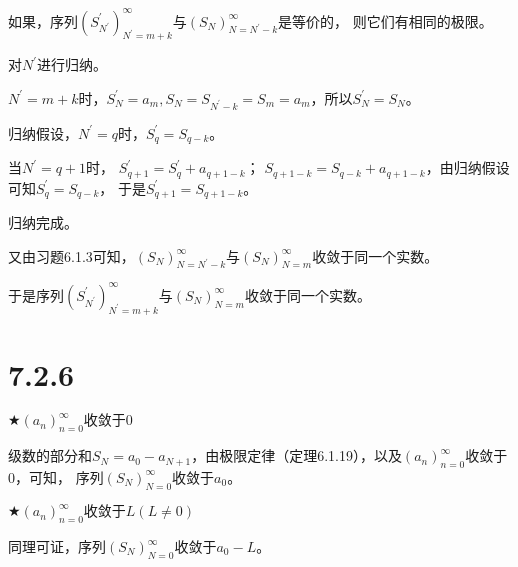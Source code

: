 \documentclass{article}
\theoremstyle{mystyle}
\begin{document}
如果，序列$(S_{N^\prime}^\prime)_{N^\prime=m+k}^\infty$与$(S_N)_{N=N^\prime-k}^\infty$是等价的，
则它们有相同的极限。

对$N^\prime$进行归纳。

$N^\prime = m+k$时，$S_N^\prime = a_m, S_N = S_{N^\prime - k} = S_m = a_m$，所以$S_N^\prime = S_N$。

归纳假设，$N^\prime = q$时，$S_q^\prime = S_{q-k}$。

当$N^\prime = q + 1$时，
$S_{q+1}^\prime = S_q^\prime + a_{q+1-k}$；
$S_{q+1-k} = S_{q-k} + a_{q+1-k}$，由归纳假设可知$S_q^\prime = S_{q-k}$，
于是$S_{q+1}^\prime = S_{q+1-k}$。

归纳完成。

又由习题6.1.3可知，$(S_N)_{N=N^\prime-k}^\infty$与$(S_N)_{N=m}^\infty$收敛于同一个实数。

于是序列$(S_{N^\prime}^\prime)_{N^\prime=m+k}^\infty$与$(S_N)_{N=m}^\infty$收敛于同一个实数。

\section*{7.2.6}

$\bigstar (a_n)_{n=0}^\infty \text{收敛于} 0$

级数的部分和$S_N = a_0 - a_{N+1}$，由极限定律（定理6.1.19），以及$(a_n)_{n=0}^\infty$收敛于0，可知，
序列$(S_N)_{N=0}^\infty$收敛于$a_0$。

$\bigstar (a_n)_{n=0}^\infty \text{收敛于} L(L \neq 0) $

同理可证，序列$(S_N)_{N=0}^\infty$收敛于$a_0 - L$。
\end{document}
